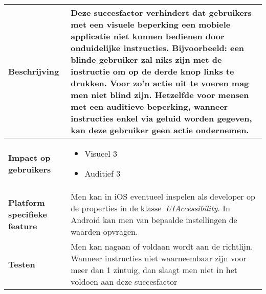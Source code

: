 \begin{table}
\begin{tabular}{|l|p{12cm}|}
        \hline
        \textbf{Beschrijving}                 & Deze succesfactor verhindert dat gebruikers met een visuele beperking een mobiele applicatie niet kunnen bedienen door onduidelijke instructies. Bijvoorbeeld: een blinde gebruiker zal niks zijn met de instructie om op de derde knop links te drukken. Voor zo’n actie uit te voeren mag men niet blind zijn. Hetzelfde voor mensen met een auditieve beperking, wanneer instructies enkel via geluid worden gegeven, kan deze gebruiker geen actie ondernemen.  \\ 
        \hline
        \textbf{Impact op gebruikers}         &  
        \begin{itemize}
            \item Visueel 3
            \item Auditief 3   
        \end{itemize}                                                                                                                                                                                                                                                                                                                                                                                                                    \\ 
        \hline
        \textbf{Platform specifieke feature}  & Men kan in iOS eventueel inspelen als developer op de properties in de klasse~\textit{UIAccessibility}. In Android kan men van bepaalde instellingen de waarden opvragen.                                                                                                                                                                                                                                                                                                                                         \\ 
        \hline
        \textbf{Testen}                       & Men kan nagaan of voldaan wordt aan de richtlijn. Wanneer instructies niet waarneembaar zijn voor meer dan 1 zintuig, dan slaagt men niet in het voldoen aan deze succesfactor                                                                                                                                                                                                                                                                                                                                    \\
        \hline
    \end{tabular}
\end{table}




